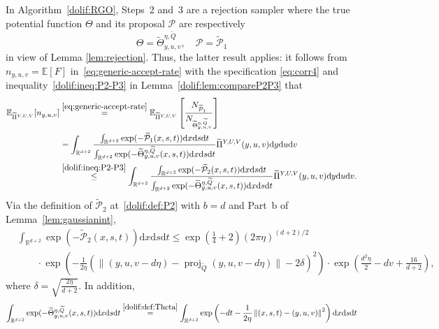 \documentclass[11pt,letterpaper]{article}
\newcommand{\R}{\mathbb{R}}
\newcommand{\norm}[1]{\left\lVert #1 \right\rVert}
\newcommand{\Q}{\widetilde{Q}}
\newcommand{\E}{\mathbb{E}}
\newcommand{\nn}{\nonumber}
\newcommand{\D}{\mathrm{d}}
\newcommand{\brac}[1]{\left( #1\right)}
\begin{document}
In Algorithm~\ref{dolif:RGO}, Steps~2 and~3 are a rejection sampler where the true potential function $\Theta$ and its proposal $\mathcal{P}$ are respectively 
 \begin{equation}\label{eq:corr4}
      \Theta = \widetilde{\Theta}^{\eta,\Q}_{y,u,v}, \quad \mathcal{P} = \widetilde{\mathcal{P}}_1
 \end{equation}
 in view of Lemma \ref{lem:rejection}. Thus, the latter result applies: it follows from $n_{y,u,v}=\E[F]$ in~\eqref{eq:generic-accept-rate} with the specification \eqref{eq:corr4} and inequality~\eqref{dolif:ineq:P2-P3} in Lemma~\ref{dolif:lem:compareP2P3} that
\begin{align}
\label{dolif:for:averagerejectionnotwarmsepa}
 \E_{\widetilde{\Pi}^{Y,U,V}} [n_{y,u,v}]&\stackrel{\eqref{eq:generic-accept-rate}}{=}\E_{\widetilde{\Pi}^{Y,U,V}}\left[\frac{N_{\widetilde{\mathcal{P}}_1}}{N_{\widetilde{\Theta}^{\eta,\Q}_{y,u,v}}} \right]\nn\\
 &=\int_{\R^{d+2}} \frac{\int_{\R^{d+2}} \exp(-\widetilde{\mathcal{P}}_1( x,s,t))  \D  x\D s\D t}{\int_{\R^{d+2}} \exp(-\widetilde{\Theta}^{\eta,\Q}_{y,u,v}( x,s,t))  \D  x\D s\D t} \widetilde{\Pi}^{Y,U,V}(y,u,v) \D y  \D u \D v\nn\\
 &\stackrel{\eqref{dolif:ineq:P2-P3}}{\leq} \int_{\R^{d+2}} \frac{\int_{\R^{d+2}} \exp(-\widetilde{\mathcal{P}}_2( x,s,t))  \D  x\D s\D t}{\int_{\R^{d+2}} \exp(-\widetilde{\Theta}^{\eta,\Q}_{y,u,v}( x,s,t))  \D  x\D s\D t} \widetilde{\Pi}^{Y,U,V}(y,u,v) \D y  \D u \D v .
\end{align}
Via the definition of $\widetilde{\mathcal{P}}_2$ at~\eqref{dolif:def:P2} with $b=d$ and Part~b of Lemma~\ref{lem:gaussianint}, 
\begin{align}
\label{dolif:inttildeP3}
&\int_{\R^{d+2}} \exp(-\widetilde{\mathcal{P}}_2( x,s,t))  \D  x\D s\D t
\leq \exp\brac{\frac{1}{4}+2}(2\pi\eta)^{(d+2)/2}\nn\\
&\qquad\cdot \exp\brac{-\frac{1}{2\eta}\left(\| (y,u,v-d\eta)-\operatorname{proj}_{\Q}(y,u,v-d\eta)\| - 2\delta\right)^2 }\cdot\exp\brac{\frac{d^2\eta}{2} - d v+\frac{16}{d+2} },
\end{align}
where $\delta = \sqrt{\frac{2\eta}{d+2}}$.
In addition, 
\begin{align}
\label{eq:intThetasimple}
    \int_{\R^{d+2}} \exp(-\widetilde{\Theta}^{\eta,\Q}_{y,u,v}( x,s,t))  \D  x\D s\D t\stackrel{\eqref{dolif:def:Theta}}{=}\int_{\R^{d+2}} \exp\brac{-dt-\frac{1}{2\eta}\norm{(x,s,t)-(y,u,v) }^2}   \D  x\D s\D t
\end{align}
\end{document}
